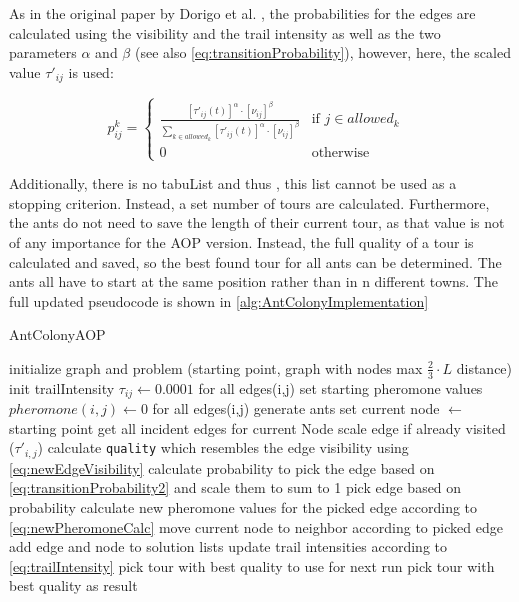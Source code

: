As in the original paper by Dorigo et al. \cite{dorigo_ant_1996}, the probabilities for the edges are calculated using the visibility and the trail intensity as well as the two parameters $\alpha$ and $\beta$ (see also \ref{eq:transitionProbability}), however, here, the scaled value $\tau'_{ij}$ is used:

\begin{equation}\label{eq:transitionProbability2}
	p_{ij}^k = \begin{cases}
		\frac{[\tau'_{ij}(t)]^{\alpha} \cdot [\nu_{ij}]^{\beta}}{\sum_{k \in allowed_k} [\tau'_{ij}(t)]^{\alpha} \cdot [\nu_{ij}]^{\beta}} &\text{if $j \in allowed_k$ }\\
		0 &\text{otherwise}
	\end{cases}
\end{equation}


Additionally, there is no tabuList and thus , this list cannot be used as a stopping criterion. 
Instead, a set number of tours are calculated.
Furthermore, the ants do not need to save the length of their current tour, as that value is not of any importance for the AOP version. 
Instead, the full quality of a tour is calculated and saved, so the best found tour for all ants can be determined.
The ants all have to start at the same position rather than in n different towns. 
The full updated pseudocode is shown in \ref{alg:AntColonyImplementation}


\begin{breakablealgorithm}
	\caption{AntColonyAOP}
	\label{alg:AntColonyImplementation}
	\begin{algorithmic}[1]
		\STATE initialize graph and problem (starting point, graph with nodes max $\frac{2}{3} \cdot L$ distance)
		\STATE init trailIntensity $\tau_{ij} \gets 0.0001$ for all edges(i,j)
		\STATE set starting pheromone values $pheromone(i,j) \gets 0$ for all edges(i,j)
		\STATE generate ants
		\STATE set current node $\gets$ starting point
		\STATE get all incident edges for current Node
		\STATE scale edge if already visited ($\tau'_{i,j}$)
		\STATE calculate \texttt{quality} which resembles the edge visibility using \ref{eq:newEdgeVisibility}
		\ENDFOR
		\STATE calculate probability to pick the edge based on \ref{eq:transitionProbability2} and scale them to sum to 1
		\STATE pick edge based on probability
		\STATE calculate new pheromone values for the picked edge according to \ref{eq:newPheromoneCalc}
		\STATE move current node to neighbor according to picked edge 
		\STATE add edge and node to solution lists
		\ENDWHILE
		\ENDFOR
		\STATE update trail intensities according to \ref{eq:trailIntensity}
		\STATE pick tour with best quality to use for next run
		\ENDFOR
		\STATE pick tour with best quality as result
	\end{algorithmic}	
\end{breakablealgorithm}

